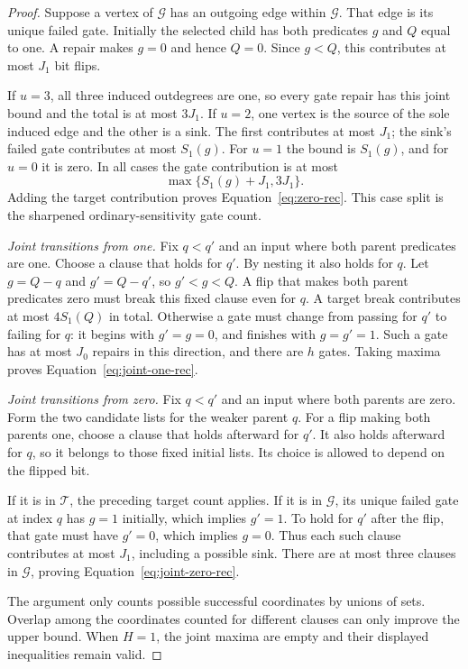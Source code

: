 \documentclass[11pt]{article}
\theoremstyle{definition}
\theoremstyle{remark}
\begin{document}
\begin{proof}
Suppose a vertex of $\mathcal G$ has an outgoing edge within
$\mathcal G$.  That edge is its unique failed gate.  Initially the
selected child has both predicates $g$ and $Q$ equal to one.  A repair
makes $g=0$ and hence $Q=0$.  Since $g<Q$, this contributes at most
$J_1$ bit flips.

If $u=3$, all three induced outdegrees are one, so every gate repair
has this joint bound and the total is at most $3J_1$.  If $u=2$, one
vertex is the source of the sole induced edge and the other is a sink.
The first contributes at most $J_1$; the sink's failed gate contributes
at most $S_1(g)$.  For $u=1$ the bound is $S_1(g)$, and for $u=0$
it is zero.  In all cases the gate contribution is at most
\[
                         \max\{S_1(g)+J_1,3J_1\}.
\]
Adding the target contribution proves Equation~\eqref{eq:zero-rec}.
This case split is the sharpened ordinary-sensitivity gate count.

\emph{Joint transitions from one.}
Fix $q<q'$ and an input where both parent predicates are one.  Choose
a clause that holds for $q'$.  By nesting it also holds for $q$.
Let $g=Q-q$ and $g'=Q-q'$, so $g'<g<Q$.  A flip that makes both
parent predicates zero must break this fixed clause even for $q$.
A target break contributes at most $4S_1(Q)$ in total.  Otherwise a
gate must change from passing for $q'$ to failing for $q$: it begins
with $g'=g=0$, and finishes with $g=g'=1$.  Such a gate has at most
$J_0$ repairs in this direction, and there are $h$ gates.  Taking
maxima proves Equation~\eqref{eq:joint-one-rec}.

\emph{Joint transitions from zero.}
Fix $q<q'$ and an input where both parents are zero.  Form the two
candidate lists for the weaker parent $q$.  For a flip making both
parents one, choose a clause that holds afterward for $q'$.  It also
holds afterward for $q$, so it belongs to those fixed initial lists.
Its choice is allowed to depend on the flipped bit.

If it is in $\mathcal T$, the preceding target count applies.  If it
is in $\mathcal G$, its unique failed gate at index $q$ has $g=1$
initially, which implies $g'=1$.  To hold for $q'$ after the flip,
that gate must have $g'=0$, which implies $g=0$.  Thus each such
clause contributes at most $J_1$, including a possible sink.  There
are at most three clauses in $\mathcal G$, proving
Equation~\eqref{eq:joint-zero-rec}.

The argument only counts possible successful coordinates by unions of
sets.  Overlap among the coordinates counted for different clauses can
only improve the upper bound.  When $H=1$, the joint maxima are empty
and their displayed inequalities remain valid.
\end{proof}
\end{document}
